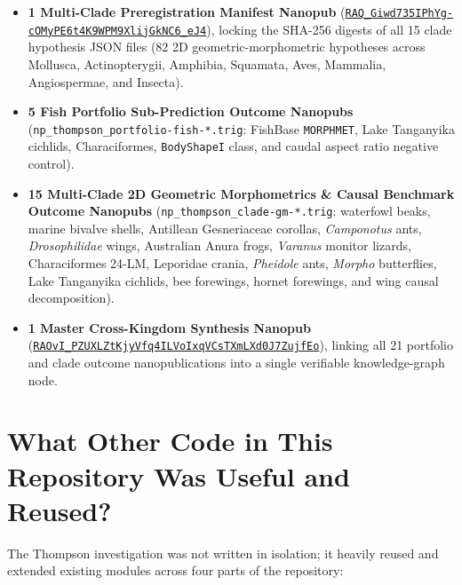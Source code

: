 \documentclass[10.5pt,a4paper]{article}
\newcommand{\code}[1]{{\footnotesize\nolinkurl{#1}}}
\begin{document}
\begin{itemize}
  \item \textbf{1 Multi-Clade Preregistration Manifest Nanopub} (\href{https://registry.knowledgepixels.com/np/RAQ_Giwd735IPhYg-cOMyPE6t4K9WPM9XlijGkNC6_eJ4}{\code{RAQ_Giwd735IPhYg-cOMyPE6t4K9WPM9XlijGkNC6_eJ4}}), locking the SHA-256 digests of all 15 clade hypothesis JSON files ($82$ 2D geometric-morphometric hypotheses across Mollusca, Actinopterygii, Amphibia, Squamata, Aves, Mammalia, Angiospermae, and Insecta).
  \item \textbf{5 Fish Portfolio Sub-Prediction Outcome Nanopubs} (\code{np_thompson_portfolio-fish-*.trig}: FishBase \texttt{MORPHMET}, Lake Tanganyika cichlids, Characiformes, \texttt{BodyShapeI} class, and caudal aspect ratio negative control).
  \item \textbf{15 Multi-Clade 2D Geometric Morphometrics \& Causal Benchmark Outcome Nanopubs} (\code{np_thompson_clade-gm-*.trig}: waterfowl beaks, marine bivalve shells, Antillean Gesneriaceae corollas, \emph{Camponotus} ants, \emph{Drosophilidae} wings, Australian Anura frogs, \emph{Varanus} monitor lizards, Characiformes 24-LM, Leporidae crania, \emph{Pheidole} ants, \emph{Morpho} butterflies, Lake Tanganyika cichlids, bee forewings, hornet forewings, and wing causal decomposition).
  \item \textbf{1 Master Cross-Kingdom Synthesis Nanopub} (\href{https://registry.knowledgepixels.com/np/RAOvI_PZUXLZtKjyVfq4ILVoIxqVCsTXmLXd0J7ZujfEo}{\code{RAOvI_PZUXLZtKjyVfq4ILVoIxqVCsTXmLXd0J7ZujfEo}}), linking all 21 portfolio and clade outcome nanopublications into a single verifiable knowledge-graph node.
\end{itemize}

\section{What Other Code in This Repository Was Useful and Reused?}

The Thompson investigation was not written in isolation; it heavily reused and extended existing modules across four parts of the repository:
\end{document}
